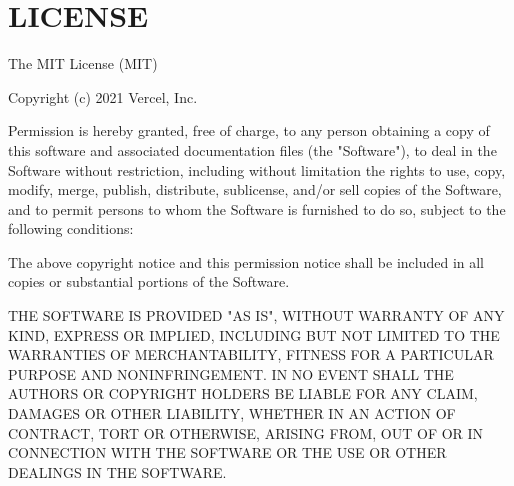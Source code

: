 \chapter{LICENSE}
\hypertarget{md_pkiclassroomrescheduler_2src_2main_2frontend_2node__modules_2arg_2_l_i_c_e_n_s_e}{}\label{md_pkiclassroomrescheduler_2src_2main_2frontend_2node__modules_2arg_2_l_i_c_e_n_s_e}
The MIT License (MIT)

Copyright (c) 2021 Vercel, Inc.

Permission is hereby granted, free of charge, to any person obtaining a copy of this software and associated documentation files (the "{}\+Software"{}), to deal in the Software without restriction, including without limitation the rights to use, copy, modify, merge, publish, distribute, sublicense, and/or sell copies of the Software, and to permit persons to whom the Software is furnished to do so, subject to the following conditions\+:

The above copyright notice and this permission notice shall be included in all copies or substantial portions of the Software.

THE SOFTWARE IS PROVIDED "{}\+AS IS"{}, WITHOUT WARRANTY OF ANY KIND, EXPRESS OR IMPLIED, INCLUDING BUT NOT LIMITED TO THE WARRANTIES OF MERCHANTABILITY, FITNESS FOR A PARTICULAR PURPOSE AND NONINFRINGEMENT. IN NO EVENT SHALL THE AUTHORS OR COPYRIGHT HOLDERS BE LIABLE FOR ANY CLAIM, DAMAGES OR OTHER LIABILITY, WHETHER IN AN ACTION OF CONTRACT, TORT OR OTHERWISE, ARISING FROM, OUT OF OR IN CONNECTION WITH THE SOFTWARE OR THE USE OR OTHER DEALINGS IN THE SOFTWARE. 